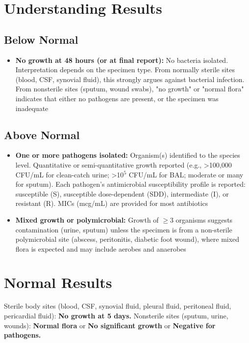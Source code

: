 \section*{Understanding Results}

\subsection*{Below Normal}
\begin{itemize}
  \item \textbf{No growth at 48 hours (or at final report):} No bacteria isolated. Interpretation depends on the specimen type. From normally sterile sites (blood, CSF, synovial fluid), this strongly argues against bacterial infection. From nonsterile sites (sputum, wound swabs), "no growth" or "normal flora" indicates that either no pathogens are present, or the specimen was inadequate
\end{itemize}

\subsection*{Above Normal}
\begin{itemize}
  \item \textbf{One or more pathogens isolated:} Organism(s) identified to the species level. Quantitative or semi-quantitative growth reported (e.g., >100,000 CFU/mL for clean-catch urine; >10$^5$ CFU/mL for BAL; moderate or many for sputum). Each pathogen's antimicrobial susceptibility profile is reported: susceptible (S), susceptible dose-dependent (SDD), intermediate (I), or resistant (R). MICs (mcg/mL) are provided for most antibiotics
  \item \textbf{Mixed growth or polymicrobial:} Growth of $\geq$3 organisms suggests contamination (urine, sputum) unless the specimen is from a non-sterile polymicrobial site (abscess, peritonitis, diabetic foot wound), where mixed flora is expected and may include aerobes and anaerobes
\end{itemize}

\section*{Normal Results}
Sterile body sites (blood, CSF, synovial fluid, pleural fluid, peritoneal fluid, pericardial fluid): \textbf{No growth at 5 days.} Nonsterile sites (sputum, urine, wounds): \textbf{Normal flora} or \textbf{No significant growth} or \textbf{Negative for pathogens.}

